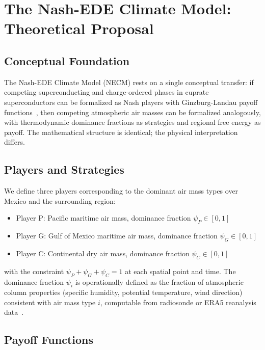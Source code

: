 \documentclass[12pt,a4paper]{article}
\begin{document}
\section{The Nash-EDE Climate Model: Theoretical Proposal}

\subsection{Conceptual Foundation}

The Nash-EDE Climate Model (NECM) rests on a single conceptual
transfer: if competing superconducting and charge-ordered phases in
cuprate superconductors can be formalized as Nash players with
Ginzburg-Landau payoff functions~\citep{CastilloSanchez2026},
then competing atmospheric air masses can be formalized analogously,
with thermodynamic dominance fractions as strategies and regional
free energy as payoff. The mathematical structure is identical; the
physical interpretation differs.

\subsection{Players and Strategies}

We define three players corresponding to the dominant air mass types
over Mexico and the surrounding region:

\begin{itemize}
\item Player P: Pacific maritime air mass, dominance fraction
      $\psi_P \in [0,1]$
\item Player G: Gulf of Mexico maritime air mass, dominance fraction
      $\psi_G \in [0,1]$
\item Player C: Continental dry air mass, dominance fraction
      $\psi_C \in [0,1]$
\end{itemize}

with the constraint $\psi_P + \psi_G + \psi_C = 1$ at each spatial
point and time. The dominance fraction $\psi_i$ is operationally
defined as the fraction of atmospheric column properties (specific
humidity, potential temperature, wind direction) consistent with
air mass type $i$, computable from radiosonde or ERA5 reanalysis~\citep{Hersbach2020} data~\citep{Hersbach2020}.

\subsection{Payoff Functions}
\end{document}
